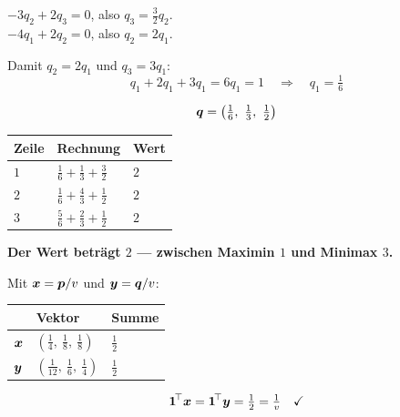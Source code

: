 \begin{merksatz}
 $-3q_2 + 2q_3 = 0$, also $q_3 = \tfrac32 q_2$.\\
 $-4q_1 + 2q_2 = 0$, also $q_2 = 2q_1$.

Damit $q_2 = 2q_1$ und $q_3 = 3q_1$:
\[ q_1 + 2q_1 + 3q_1 = 6q_1 = 1 \quad\Longrightarrow\quad q_1 = \tfrac16 \]

\[ \vek q = \left(\tfrac16,\ \tfrac13,\ \tfrac12\right) \]

\begin{center}
\renewcommand{\arraystretch}{1.48}
\begin{tabular}{@{}P{2.0cm}P{4.0cm}P{1.6cm}@{}}
\toprule
\textbf{Zeile} & \textbf{Rechnung} & \textbf{Wert}\\
\midrule
$1$ & $\tfrac16+\tfrac13+\tfrac32$ & $2$\\
$2$ & $\tfrac16+\tfrac43+\tfrac12$ & $2$\\
$3$ & $\tfrac56+\tfrac23+\tfrac12$ & $2$\\
\bottomrule
\end{tabular}
\end{center}
\checkmark

\begin{center}
\begin{minipage}{0.9\textwidth}
\textbf{Der Wert beträgt $2$ --- zwischen Maximin $1$ und Minimax $3$.}
\end{minipage}
\end{center}

Mit $\boldsymbol{x} = \boldsymbol{p}/v$ und $\boldsymbol{y} = \boldsymbol{q}/v$:
\begin{center}
{\small
\renewcommand{\arraystretch}{1.48}
\begin{tabular}{@{}P{2.0cm}P{3.0cm}P{2.6cm}@{}}
\toprule
& \textbf{Vektor} & \textbf{Summe}\\
\midrule
$\boldsymbol{x}$ & $(\tfrac14,\ \tfrac18,\ \tfrac18)$ & $\tfrac12$\\
$\boldsymbol{y}$ & $(\tfrac1{12},\ \tfrac16,\ \tfrac14)$ & $\tfrac12$\\
\bottomrule
\end{tabular}}
\end{center}

\[ \boldsymbol{1}^{\!\top}\boldsymbol{x} = \boldsymbol{1}^{\!\top}\boldsymbol{y} = \tfrac12 = \tfrac1v \quad \checkmark \]

\begin{center}
\begin{minipage}{0.88\textwidth}
\end{minipage}
\end{center}
\end{merksatz}

